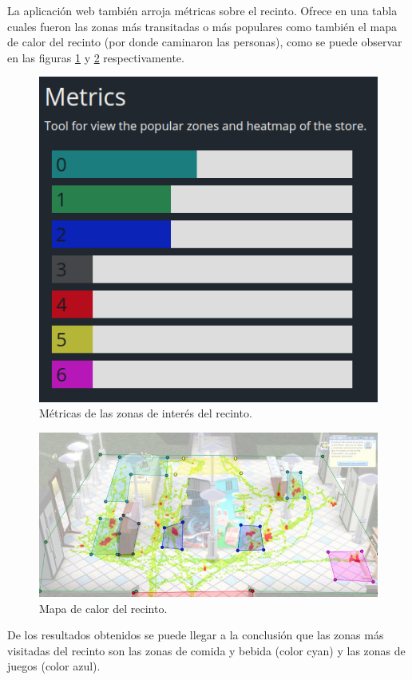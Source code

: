 \newpage

La aplicación web también arroja métricas sobre el recinto. Ofrece en una tabla cuales fueron las zonas más transitadas o más populares como también el mapa de calor del recinto (por donde caminaron las personas), como se puede observar en las figuras \ref{fig:metricasWebApp} y \ref{fig:metricasWebApp2} respectivamente.

\begin{figure}[ht]
	\centering
	\includegraphics[scale=.80]{./Figures/metricasWebApp.png}
	\caption{Métricas de las zonas de interés del recinto.}
	\label{fig:metricasWebApp}
\end{figure}

\begin{figure}[ht]
	\centering
	\includegraphics[scale=.70]{./Figures/metricasWebApp2.jpg}
	\caption{Mapa de calor del recinto.}
	\label{fig:metricasWebApp2}
\end{figure}

\newpage

De los resultados obtenidos se puede llegar a la conclusión que las zonas más visitadas del recinto son las zonas de comida y bebida (color cyan) y las zonas de juegos (color azul).